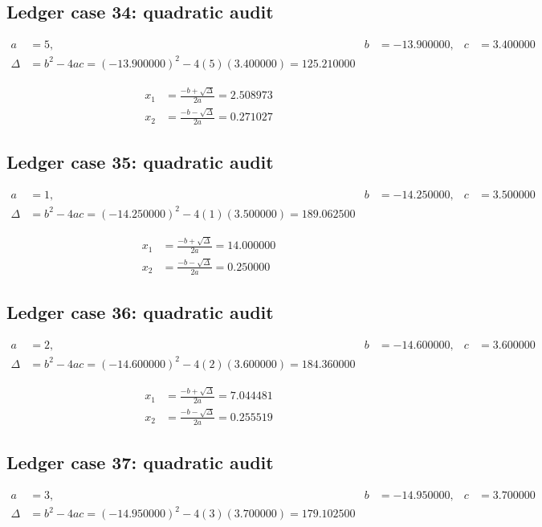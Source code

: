 \documentclass[11pt,a4paper]{article}
\begin{document}
\newpage

\subsection{Ledger case 34: quadratic audit}
\begin{align}
a &= 5, & b &= -13.900000, & c &= 3.400000 \\
\Delta &= b^2-4ac = (-13.900000)^2 - 4(5)(3.400000) = 125.210000
\end{align}

\begin{align}
x_1 &= \frac{-b+\sqrt{\Delta}}{2a} = 2.508973 \\
x_2 &= \frac{-b-\sqrt{\Delta}}{2a} = 0.271027
\end{align}

\subsection{Ledger case 35: quadratic audit}
\begin{align}
a &= 1, & b &= -14.250000, & c &= 3.500000 \\
\Delta &= b^2-4ac = (-14.250000)^2 - 4(1)(3.500000) = 189.062500
\end{align}

\begin{align}
x_1 &= \frac{-b+\sqrt{\Delta}}{2a} = 14.000000 \\
x_2 &= \frac{-b-\sqrt{\Delta}}{2a} = 0.250000
\end{align}

\subsection{Ledger case 36: quadratic audit}
\begin{align}
a &= 2, & b &= -14.600000, & c &= 3.600000 \\
\Delta &= b^2-4ac = (-14.600000)^2 - 4(2)(3.600000) = 184.360000
\end{align}

\begin{align}
x_1 &= \frac{-b+\sqrt{\Delta}}{2a} = 7.044481 \\
x_2 &= \frac{-b-\sqrt{\Delta}}{2a} = 0.255519
\end{align}

\newpage

\subsection{Ledger case 37: quadratic audit}
\begin{align}
a &= 3, & b &= -14.950000, & c &= 3.700000 \\
\Delta &= b^2-4ac = (-14.950000)^2 - 4(3)(3.700000) = 179.102500
\end{align}
\end{document}
